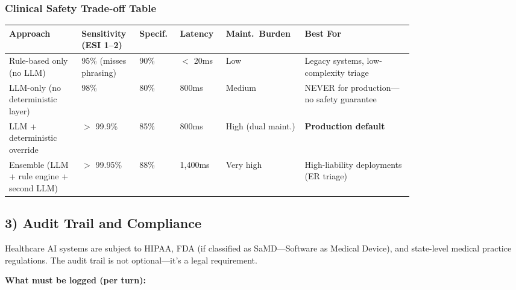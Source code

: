 \subsubsection*{Clinical Safety Trade-off Table}

{\small
\begin{tabular}{|p{0.16\linewidth}|p{0.1\linewidth}|p{0.08\linewidth}|p{0.08\linewidth}|p{0.12\linewidth}|p{0.24\linewidth}|}
\hline
\textbf{Approach} & \textbf{Sensitivity (ESI 1--2)} & \textbf{Specif.} & \textbf{Latency} & \textbf{Maint.\ Burden} & \textbf{Best For} \\
\hline
Rule-based only (no LLM) & 95\% (misses phrasing) & 90\% & $<$ 20ms & Low & Legacy systems, low-complexity triage \\
\hline
LLM-only (no deterministic layer) & 98\% & 80\% & 800ms & Medium & NEVER for production---no safety guarantee \\
\hline
LLM + deterministic override & $>$ 99.9\% & 85\% & 800ms & High (dual maint.) & \textbf{Production default} \\
\hline
Ensemble (LLM + rule engine + second LLM) & $>$ 99.95\% & 88\% & 1,400ms & Very high & High-liability deployments (ER triage) \\
\hline
\end{tabular}
}

\subsection*{3) Audit Trail and Compliance}

Healthcare AI systems are subject to HIPAA, FDA (if classified as SaMD---Software as Medical Device), and state-level medical practice regulations. The audit trail is not optional---it's a legal requirement.

\textbf{What must be logged (per turn):}

